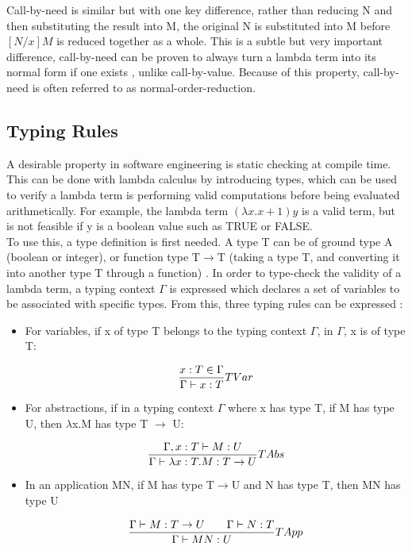 \documentclass[a4paper,11pt]{report}
\begin{document}
Call-by-need is similar but with one key difference, rather than reducing N and then substituting the result into M, the original N is substituted into M before $[N / x]M$ is reduced together as a whole. This is a subtle but very important difference, call-by-need can be proven to always turn a lambda term into its normal form if one exists \cite{Horowitz2013}, unlike call-by-value. Because of this property, call-by-need is often referred to as normal-order-reduction.

\subsection{Typing Rules}

A desirable property in software engineering is static checking at compile time. This can be done with lambda calculus by introducing types, which can be used to verify a lambda term is performing valid computations before being evaluated arithmetically. For example, the lambda term $(\lambda x.x+1)y$ is a valid term, but is not feasible if y is a boolean value such as TRUE or FALSE.\\

To use this, a type definition is first needed. A type T can be of ground type A (boolean or integer), or function type T$\rightarrow$T (taking a type T, and converting it into another type T through a function) \cite{Gay2019}. In order to type-check the validity of a lambda term, a typing context $\Gamma$ is expressed which declares a set of variables to be associated with specific types. From this, three typing rules can be expressed \cite{Gay2019}:

\begin{itemize}
	\item For variables, if x of type T belongs to the typing context $\Gamma$, in $\Gamma$, x is of type T:
	
	\begin{equation}
	\centering
	\frac{x:T\in \Gamma}{\Gamma \vdash x:T}TVar
	\label{variable_type}
	\end{equation}
	\item For abstractions, if in a typing context $\Gamma$ where x has type T, if M has type U, then $\lambda$x.M has type T $\rightarrow$ U:
	
	\begin{equation}
	\centering
	\frac{\Gamma ,x:T\vdash M:U}{\Gamma \vdash \lambda x:T.M:T \to U}TAbs
	\end{equation}
	\item  In an application MN, if M has type T$\rightarrow$U and N has type T, then MN has type U
	
	\begin{equation}
	\centering
	\frac{\Gamma \vdash M:T \to U \qquad \Gamma \vdash N:T}{\Gamma \vdash MN:U}TApp
	\label{application_types}
	\end{equation}
\end{itemize}
\end{document}
